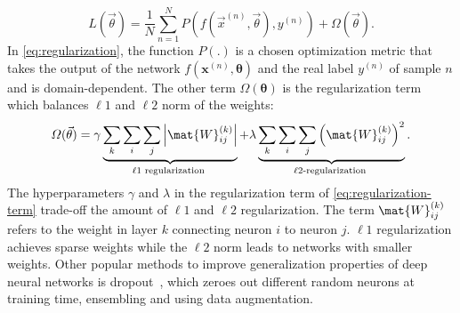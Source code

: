 \begin{equation}\label{eq:regularization}
	L(\vec{\theta})=\frac{1}{N} \sum_{n=1}^{N} P\left(f\left(\vec{x}^{(n)}, \vec{\theta}\right), y^{(n)}\right)+\Omega(\vec{\theta}).
\end{equation}
In \cref{eq:regularization}, the function $P(.)$ is a chosen optimization metric that takes the output of the network $f\left(\boldsymbol{x}^{(n)}, \boldsymbol{\theta}\right)$ and the real label $y^{(n)}$ of sample $n$ and is domain-dependent. The other term $\Omega(\boldsymbol{\theta})$ is the regularization term which balances $\ell 1$ and $\ell 2$ norm of the weights:
\begin{equation} \label{eq:regularization-term}
	\Omega(\vec{\theta})=\gamma \underbrace{\sum_{k} \sum_{i} \sum_{j}\left|\mat{W}_{i j}^{(k)}\right|}_{\ell 1 \text { regularization }}+\lambda \underbrace{\sum_{k} \sum_{i} \sum_{j}\left(\mat{W}_{i j}^{(k)}\right)^{2}}_{\ell 2 \text {-regularization }}.
\end{equation}
The hyperparameters $\gamma$ and $\lambda$ in the regularization term of \cref{eq:regularization-term} trade-off the amount of $\ell 1$ and $\ell 2$ regularization. The term $\mat{W}_{i j}^{(k)}$ refers to the weight in layer $k$ connecting neuron $i$ to neuron $j$. $\ell 1$ regularization achieves sparse weights while the $\ell 2$ norm leads to networks with smaller weights. Other popular methods to improve generalization properties of deep neural networks is dropout~\autocite{dropout}, which zeroes out different random neurons at training time, ensembling and using data augmentation.

